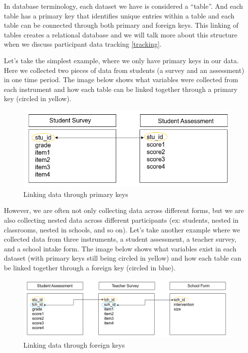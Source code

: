 \documentclass[
]{book}
\begin{document}
In database terminology, each dataset we have is considered a ``table''. And each table has a primary key that identifies unique entries within a table and each table can be connected through both primary and foreign keys. This linking of tables creates a relational database and we will talk more about this structure when we discuss participant data tracking \ref{tracking}.

Let's take the simplest example, where we only have primary keys in our data. Here we collected two pieces of data from students (a survey and an assessment) in one time period. The image below shows what variables were collected from each instrument and how each table can be linked together through a primary key (circled in yellow).

\begin{figure}

{\centering \includegraphics[width=0.7\linewidth]{img/link0} 

}

\caption{Linking data through primary keys}\label{fig:unnamed-chunk-9}
\end{figure}

However, we are often not only collecting data across different forms, but we are also collecting nested data across different participants (ex: students, nested in classrooms, nested in schools, and so on). Let's take another example where we collected data from three instruments, a student assessment, a teacher survey, and a school intake form. The image below shows what variables exist in each dataset (with primary keys still being circled in yellow) and how each table can be linked together through a foreign key (circled in blue).

\begin{figure}

{\centering \includegraphics[width=1\linewidth]{img/link1} 

}

\caption{Linking data through foreign keys}\label{fig:unnamed-chunk-10}
\end{figure}
\end{document}
